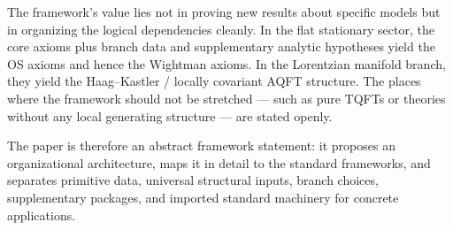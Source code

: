 \documentclass[12pt,a4paper]{article}
\theoremstyle{plain}
\theoremstyle{definition}
\theoremstyle{remark}
\begin{document}
The framework's value lies not in proving new results about specific
models but in organizing the logical dependencies cleanly. In the flat
stationary sector, the core axioms plus branch data and
supplementary analytic hypotheses yield the OS axioms and hence the
Wightman axioms. In the Lorentzian manifold branch, they yield the
Haag--Kastler / locally covariant AQFT structure. The places where the
framework should not be stretched --- such as pure TQFTs or theories
without any local generating structure --- are stated openly.

The paper is therefore an abstract framework statement: it proposes an
organizational architecture, maps it in detail to the standard
frameworks, and separates primitive data, universal structural inputs,
branch choices, supplementary packages, and imported standard
machinery for concrete applications.
\end{document}
